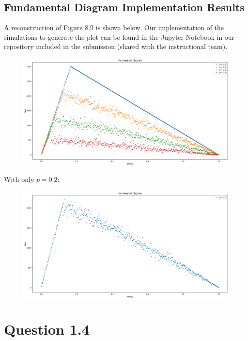 \documentclass{article}
\begin{document}
\subsection{Fundamental Diagram Implementation Results}
A reconstruction of Figure 8.9 is shown below. Our implementation of the simulations to generate the plot can be found in the Jupyter Notebook in our repository included in the submission (shared with the instructional team).

\begin{figure}[!h]
    \centering
    \includegraphics[width=0.8\linewidth]{assets/3.png}
\end{figure}
\newpage
With only $p=0.2$:
\begin{figure}[!h]
    \centering
    \includegraphics[width=0.75\linewidth]{assets/30.2.png}
\end{figure}

\newpage
\section{Question 1.4}
\end{document}
